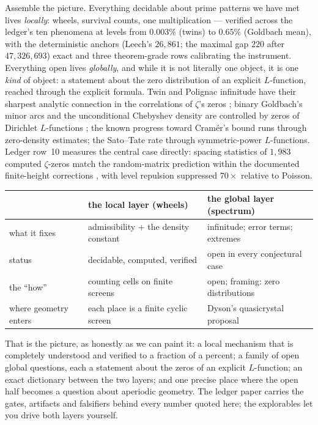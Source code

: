 \documentclass[11pt]{article}
\begin{document}
Assemble the picture. Everything decidable about prime patterns we have
met lives \emph{locally}: wheels, survival counts, one multiplication ---
verified across the ledger's ten phenomena at levels from $0.003\%$
(twins) to $0.65\%$ (Goldbach mean), with the deterministic anchors
(Leech's $26{,}861$; the maximal gap $220$ after $47{,}326{,}693$) exact
and three theorem-grade rows calibrating the instrument. Everything open
lives \emph{globally}, and while it is not literally one object, it is
one \emph{kind} of object: a statement about the zero distribution of an
explicit $L$-function, reached through the explicit formula. Twin and
Polignac infinitude have their sharpest analytic connection in the
correlations of $\zeta$'s zeros \cite{Goldston,Montgomery}; binary
Goldbach's minor arcs and the unconditional Chebyshev density are
controlled by zeros of Dirichlet $L$-functions \cite{RubinsteinSarnak};
the known progress toward Cram\'er's bound runs through zero-density
estimates; the Sato--Tate rate through symmetric-power $L$-functions. Ledger row~10 measures
the central case directly: spacing statistics of $1{,}983$ computed
$\zeta$-zeros match the random-matrix prediction within the documented
finite-height corrections \cite{Berry,Odlyzko}, with level repulsion
suppressed $70\times$ relative to Poisson.

\begin{center}\small
\begin{tabular}{@{}lll@{}}
\toprule
 & the local layer (wheels) & the global layer (spectrum) \\
\midrule
what it fixes & admissibility + the density constant & infinitude;
error terms; extremes \\
status & decidable, computed, verified & open in every conjectural case \\
the ``how'' & counting cells on finite screens & open; framing: zero
distributions \\
where geometry enters & each place is a finite cyclic screen &
Dyson's quasicrystal proposal \\
\bottomrule
\end{tabular}
\end{center}

That is the picture, as honestly as we can paint it: a local mechanism
that is completely understood and verified to a fraction of a percent;
a family of open global questions, each a statement about the zeros of
an explicit $L$-function; an exact dictionary between the two layers;
and one precise place where the open half becomes a question about
aperiodic geometry. The ledger paper carries the gates, artifacts and
falsifiers behind every number quoted here; the explorables let you
drive both layers yourself.
\end{document}
